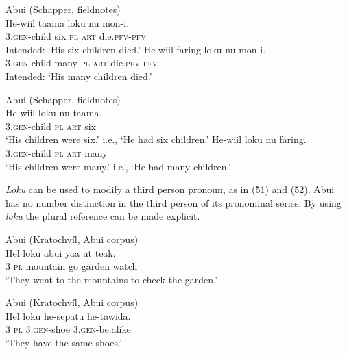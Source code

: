 \ea%
\label{ex:49}
Abui  (Schapper, fieldnotes)\\
\ea
\gll *He-wiil taama loku nu mon-i.\\
   \textsc{3.gen}-child six \textsc{pl} \textsc{art} die.\textsc{pfv}-\textsc{pfv} \\
\glt Intended: `His six children died.'
\ex
\gll *He-wiil faring loku nu mon-i.\\
 \textsc{3.gen}-child many \textsc{pl} \textsc{art} die.\textsc{pfv}-\textsc{pfv}   \\
\glt  Intended: `His many children died.'
\z
\z





\ea%
\label{ex:50}
Abui  (Schapper, fieldnotes)\\
\ea
\gll  He-wiil loku nu {taama.}\\
  \textsc{3.gen}-child \textsc{pl} \textsc{art} six  \\
\glt `His children were six.' i.e., `He had six children.'
\ex
\gll He-wiil loku nu faring. \\
 \textsc{3.gen}-child \textsc{pl} \textsc{art} many   \\
\glt  `His children were many.' i.e., `He had many children.'
\z
\z






\textit{Loku} can be used to modify a third person pronoun, as in (51) and (52). Abui has no number distinction in the third person of its pronominal series. By using \textit{loku} the plural reference can be made explicit.


\ea%
\label{ex:51}
Abui (Kratochv\'il, Abui corpus)\\
\gll  Hel loku abui yaa ut {teak.}\\
  3 \textsc{pl}   mountain go garden watch  \\
\glt `They went to the mountains to check the garden.'
\z







\ea%
\label{ex:52}
Abui (Kratochv\'il, Abui corpus)\\
\gll  Hel loku he-sepatu {he-tawida}. \\
  3 \textsc{pl}   \textsc{3.gen}-shoe \textsc{3.gen}-be.alike   \\
\glt `They have the same shoes.'
\z






